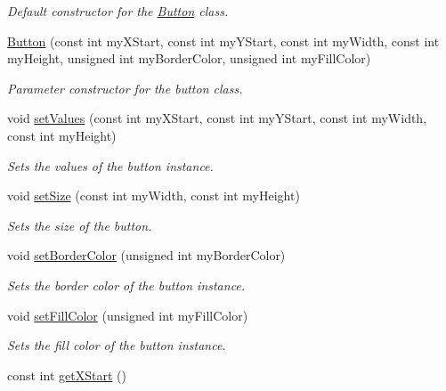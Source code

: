 \begin{DoxyCompactItemize}
\begin{DoxyCompactList}\small\item\em Default constructor for the \hyperlink{class_button}{Button} class. \end{DoxyCompactList}\item 
\hyperlink{class_button_a05d9eb876fbf996d19ccd50701d520d6}{Button} (const int my\+X\+Start, const int my\+Y\+Start, const int my\+Width, const int my\+Height, unsigned int my\+Border\+Color, unsigned int my\+Fill\+Color)
\begin{DoxyCompactList}\small\item\em Parameter constructor for the button class. \end{DoxyCompactList}\item 
void \hyperlink{class_button_a60111eec4fe5e1c3c71b8b183fa76fdb}{set\+Values} (const int my\+X\+Start, const int my\+Y\+Start, const int my\+Width, const int my\+Height)
\begin{DoxyCompactList}\small\item\em Sets the values of the button instance. \end{DoxyCompactList}\item 
void \hyperlink{class_button_a12e8f5a7a8ff3207acb9fe0e3f36c88c}{set\+Size} (const int my\+Width, const int my\+Height)
\begin{DoxyCompactList}\small\item\em Sets the size of the button. \end{DoxyCompactList}\item 
void \hyperlink{class_button_a915d85f07149cce21cc8b61f8b8a4496}{set\+Border\+Color} (unsigned int my\+Border\+Color)
\begin{DoxyCompactList}\small\item\em Sets the border color of the button instance. \end{DoxyCompactList}\item 
void \hyperlink{class_button_a66a48aee66e78d135c3333d6364d1643}{set\+Fill\+Color} (unsigned int my\+Fill\+Color)
\begin{DoxyCompactList}\small\item\em Sets the fill color of the button instance. \end{DoxyCompactList}\item 
\hypertarget{class_button_a10a7f30eaf80e1ea4b0f22491e12ca70}{const int \hyperlink{class_button_a10a7f30eaf80e1ea4b0f22491e12ca70}{get\+X\+Start} ()}\label{class_button_a10a7f30eaf80e1ea4b0f22491e12ca70}


\end{DoxyCompactItemize}
